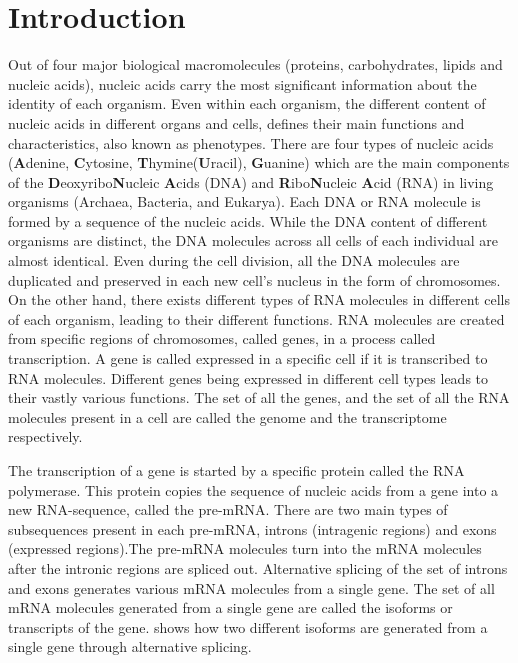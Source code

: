 
\renewcommand{\thechapter}{1}


\chapter{Introduction} %
\label{intro} %

Out of four major biological macromolecules (proteins, carbohydrates, lipids 
and nucleic acids), nucleic acids carry the most significant information about 
the identity of each organism. Even within each organism, the different 
content of nucleic acids in different organs and cells, defines their main 
functions and characteristics, also known as phenotypes. There are four 
types of nucleic acids (\textbf{A}denine, \textbf{C}ytosine, 
\textbf{T}hymine(\textbf{U}racil), \textbf{G}uanine) which are 
the main components of the \textbf{D}eoxyribo\textbf{N}ucleic 
\textbf{A}cids (DNA) and \textbf{R}ibo\textbf{N}ucleic 
\textbf{A}cid (RNA) in living organisms (Archaea, Bacteria, and Eukarya). 
Each DNA or RNA molecule is formed by a sequence of the nucleic acids. 
While the DNA content of different organisms are distinct, the DNA molecules 
across all cells of each individual are almost identical. Even during 
the cell division, all the DNA molecules are duplicated and preserved 
in each new cell's nucleus in the form of chromosomes. On the other hand, 
there exists different types of RNA molecules in different cells of each 
organism, leading to their different functions. RNA molecules are created 
from specific regions of chromosomes, called genes, in a process called 
transcription. A gene is called expressed in a specific cell if it is 
transcribed to RNA molecules. Different genes being expressed in different 
cell types leads to their vastly various functions. The set of all the genes, 
and the set of all the RNA molecules present in a cell are called the genome 
and the transcriptome respectively.

The transcription of a gene is started by a specific protein called the RNA 
polymerase. This protein copies the sequence of nucleic acids from a gene into 
a new RNA-sequence, called the pre-mRNA. There are two main types of 
subsequences present in each pre-mRNA, introns (intragenic regions) and exons 
(expressed regions).The pre-mRNA molecules turn into the mRNA molecules after 
the intronic regions are spliced out.
Alternative splicing of the set of introns and exons generates various mRNA 
molecules from a single gene. The set of all mRNA molecules generated from a 
single gene are called the isoforms or transcripts of the gene. 
 shows how two different isoforms are generated 
from a single gene through alternative splicing.

